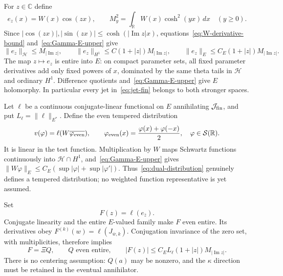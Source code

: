 \documentclass[11pt,a4paper]{article}
\numberwithin{equation}{section}
\theoremstyle{definition}
\theoremstyle{remark}
\newcommand{\R}{\mathbb R}
\newcommand{\C}{\mathbb C}
\newcommand{\Hh}{\mathcal H}
\newcommand{\norm}[1]{\lVert #1\rVert}
\begin{document}
For $z\in\C$ define
\[
 e_z(x)=W(x)\cos(zx),\qquad
 M_y^2=\int_\R W(x)\cosh^2(yx)\,dx\quad(y\ge0).
\]
Since $|\cos(zx)|,|\sin(zx)|\le\cosh(|\operatorname{Im}z|x)$, equations~\eqref{eq:W-derivative-bound} and~\eqref{eq:Gamma-E-upper} give
\begin{equation}\label{eq:dual-evaluation}
 \norm{e_z}_{\Hh}\le M_{|\operatorname{Im}z|},\qquad
 \norm{e_z}_{H^1}\le C(1+|z|)M_{|\operatorname{Im}z|},\qquad
 \norm{e_z}_E\le C_E(1+|z|)M_{|\operatorname{Im}z|}.
\end{equation}
The map $z\mapsto e_z$ is entire into $E$: on compact parameter sets, all fixed parameter derivatives add only fixed powers of $x$, dominated by the same theta tails in $\Hh$ and ordinary $H^1$. Difference quotients and~\eqref{eq:Gamma-E-upper} give $E$ holomorphy. In particular every jet in~\eqref{eq:jet-fin} belongs to both stronger spaces.

Let $\ell$ be a continuous conjugate-linear functional on $E$ annihilating $\mathcal J_{\rm fin}$, and put $L_\ell=\norm{\ell}_{E^*}$. Define the even tempered distribution
\begin{equation}\label{eq:dual-distribution}
 v(\varphi)=\ell(W\overline{\varphi_{\rm even}}),\qquad
 \varphi_{\rm even}(x)=\frac{\varphi(x)+\varphi(-x)}2,
 \quad\varphi\in\mathcal S(\R).
\end{equation}
It is linear in the test function. Multiplication by $W$ maps Schwartz functions continuously into $\Hh\cap H^1$, and~\eqref{eq:Gamma-E-upper} gives
$\norm{W\varphi}_E\le C_E(\sup|\varphi|+\sup|\varphi'|)$.
Thus~\eqref{eq:dual-distribution} genuinely defines a tempered distribution; no weighted function representative is yet assumed.

Set
\begin{equation}\label{eq:dual-entire}
 F(z)=\ell(e_{\overline z}).
\end{equation}
Conjugate linearity and the entire $E$-valued family make $F$ even entire. Its derivatives obey
$F^{(k)}(w)=\ell(J_{\overline w,k})$.
Conjugation invariance of the zero set, with multiplicities, therefore implies
\begin{equation}\label{eq:dual-quotient}
 F=\Xi Q,\qquad Q\text{ even entire},\qquad
 |F(z)|\le C_E L_\ell(1+|z|)M_{|\operatorname{Im}z|}.
\end{equation}
There is no centering assumption: $Q(a)$ may be nonzero, and the $\kappa$ direction must be retained in the eventual annihilator.
\end{document}
